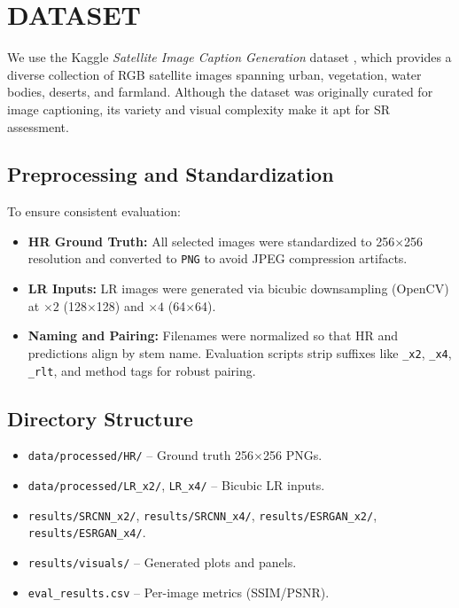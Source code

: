 \documentclass[]{spie}
\begin{document}
\section{DATASET}
We use the Kaggle \textit{Satellite Image Caption Generation} dataset \cite{kaggle_dataset}, which provides a diverse collection of RGB satellite images spanning urban, vegetation, water bodies, deserts, and farmland. Although the dataset was originally curated for image captioning, its variety and visual complexity make it apt for SR assessment.

\subsection{Preprocessing and Standardization}
To ensure consistent evaluation:
\begin{itemize}
    \item \textbf{HR Ground Truth:} All selected images were standardized to 256$\times$256 resolution and converted to \texttt{PNG} to avoid JPEG compression artifacts.
    \item \textbf{LR Inputs:} LR images were generated via bicubic downsampling (OpenCV) at $\times2$ (128$\times$128) and $\times4$ (64$\times$64).
    \item \textbf{Naming and Pairing:} Filenames were normalized so that HR and predictions align by stem name. Evaluation scripts strip suffixes like \texttt{\_x2}, \texttt{\_x4}, \texttt{\_rlt}, and method tags for robust pairing.
\end{itemize}

\subsection{Directory Structure}
\begin{itemize}
  \item \texttt{data/processed/HR/} – Ground truth 256$\times$256 PNGs.
  \item \texttt{data/processed/LR\_x2/}, \texttt{LR\_x4/} – Bicubic LR inputs.
  \item \texttt{results/SRCNN\_x2/}, \texttt{results/SRCNN\_x4/}, \texttt{results/ESRGAN\_x2/}, \texttt{results/ESRGAN\_x4/}.
  \item \texttt{results/visuals/} – Generated plots and panels.
  \item \texttt{eval\_results.csv} – Per-image metrics (SSIM/PSNR).
\end{itemize}
\end{document}
